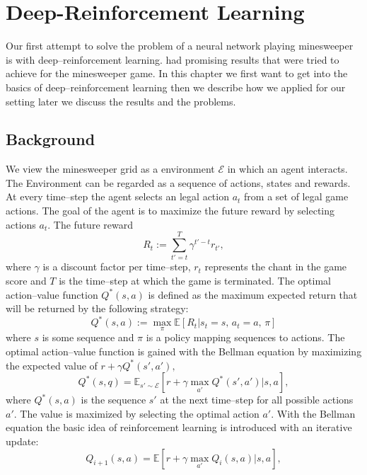 \chapter{Deep-Reinforcement Learning}
Our first attempt to solve the problem of a neural network playing minesweeper is with deep--reinforcement learning. 
had promising results that were tried to achieve for the minesweeper game.
In this chapter we first want to get into the basics of deep--reinforcement learning then we describe how we applied for our setting later we discuss the results and the problems.

\section{Background}
We view the minesweeper grid as a environment $\mathcal{E}$ in which an agent interacts. 
The Environment can be regarded as a sequence of actions, states and rewards.
At every time--step the agent selects an legal action $a_t$ from a set of legal game actions. 
The goal of the agent is to maximize the future reward by selecting actions $a_t$. The future reward
\begin{equation}
R_t := \sum_{t'=t}^T \gamma^{t'-t}r_{t'},
\end{equation}
where $\gamma$ is a discount factor per time--step, $r_t$ represents the chant in the game score and $T$ is the time--step at which the game is terminated.
The optimal action--value function $Q^*\left(s,a\right)$ is defined as the maximum expected return that will be returned by the following strategy:
\begin{equation}
Q^*\left(s,a\right):= \max_\pi \mathbb{E} \left[ R_t|s_t=s\text{, }a_t=a\text{, } \pi\right]
\end{equation}
where $s$ is some sequence and $\pi$ is a policy mapping sequences to actions.
The optimal action--value function is gained with the Bellman equation by maximizing the expected value of $r+\gamma Q^*\left(s',a'\right),$
\begin{equation}
Q^*\left(s,q\right)= \mathbb{E}_{s' \sim \mathcal{E}} \left[ r + \gamma \max_{a'} Q^*\left(s',a'\right)| s,a \right],
\end{equation}
where $Q^*\left(s,a\right)$ is the sequence $s'$ at the next time--step for all possible actions $a'$. 
The value is maximized by selecting the optimal action $a'$.
With the Bellman equation the basic idea of reinforcement learning is introduced with an iterative update:
\begin{equation}
Q_{i+1}\left(s,a\right)= \mathbb{E}\left[r+\gamma \max_{a'} Q_i\left(s,a\right)| s,a\right],
\end{equation} 
